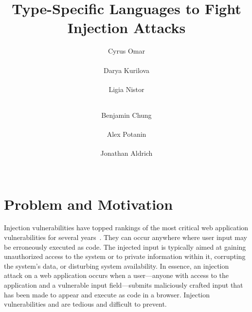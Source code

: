 \documentclass{sig-alternate}
\newcommand{\qs}[1]{}%
\begin{document}

\title{Type-Specific Languages to Fight Injection Attacks}


\author{
\alignauthor Cyrus Omar\\
       \\
\alignauthor Darya Kurilova\\
       \\
\alignauthor Ligia Nistor\\
       \\
\and  %
\alignauthor Benjamin Chung\\
       \\
\alignauthor Alex Potanin\\
       \\
\alignauthor Jonathan Aldrich\\
       \\
}

\maketitle

%

\section{Problem and Motivation}
\qs{Clearly state the problem being addressed and explain the reasons for seeking a solution to this problem.}

Injection vulnerabilities have topped rankings of the most critical web application vulnerabilities for several years~\cite{cwsans,owasp}. They can occur anywhere where user input may be erroneously executed as code. The injected input is typically aimed at gaining unauthorized access to the system or to private information within it, corrupting the system's data, or disturbing system availability. In essence, an injection attack on a web application occurs when a user---anyone with access to the application and a vulnerable input field---submits maliciously crafted input that has been made to appear and execute as code in a browser. Injection vulnerabilities and are tedious and difficult to prevent.
\end{document}
